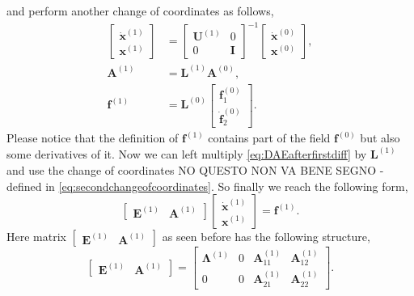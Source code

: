 		and perform another change of coordinates as follows,
		\begin{subequations}
			\label{eq:secondchangeofcoordinates}
			\begin{align*}
				\begin{bmatrix}
					\dot{\bm{x}}^{(1)} \\
					\bm{x}^{(1)} 
				\end{bmatrix}
				&=
				\begin{bmatrix}
					\bm{U}^{(1)} & 0 \\
					0 & \bm{I} 
				\end{bmatrix}^{-1}
				\begin{bmatrix}
					\dot{\bm{x}}^{(0)} \\
					\bm{x}^{(0)}
				\end{bmatrix}, \\
				\bm{A}^{(1)} 		&= \bm{L}^{(1)}\bm{A}^{(0)}, \\
				\bm{f}^{(1)} 		&= \bm{L}^{(0)}
				\begin{bmatrix}
					\bm{f}_{1}^{(0)} \\
					\dot{\bm{f}}_{2}^{(0)}
				\end{bmatrix}.
			\end{align*}
		\end{subequations}
		Please notice that the definition of $\bm{f}^{(1)}$ contains part of the field $\bm{f}^{(0)}$ but also some derivatives of it. Now we can left multiply \cref{eq:DAEafterfirstdiff} by $\bm{L}^{(1)}$  and use the change of coordinates NO QUESTO NON VA BENE SEGNO - defined in \cref{eq:secondchangeofcoordinates}. So finally we reach the following form, 
		\begin{equation}
			\begin{bmatrix}
				\bm{E}^{(1)} & \bm{A}^{(1)} 
			\end{bmatrix}
			\begin{bmatrix}
				\dot{\bm{x}}^{(1)} \\
				\bm{x}^{(1)}
			\end{bmatrix} = \bm{f}^{(1)}.
		\end{equation}
		Here matrix $\begin{bmatrix}\bm{E}^{(1)} & \bm{A}^{(1)}\end{bmatrix}$ as seen before has the following structure, 
		\begin{equation}
			\begin{bmatrix}
				\bm{E}^{(1)} & \bm{A}^{(1)}
			\end{bmatrix}
			=
			\begin{bmatrix}
				\bm{\Lambda}^{(1)} 	& 0 & \bm{A}_{11}^{(1)} & \bm{A}_{12}^{(1)}  \\
				0 					& 0 & \bm{A}_{21}^{(1)} & \bm{A}_{22}^{(1)}
			\end{bmatrix}.
		\end{equation}
